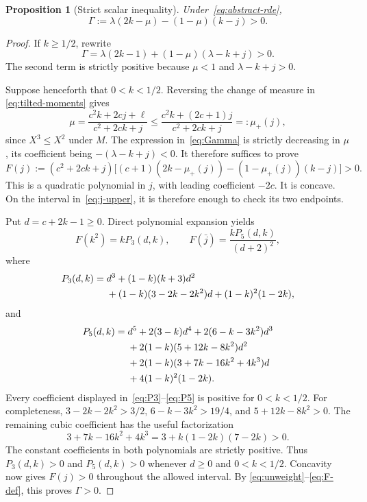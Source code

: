\documentclass[11pt,a4paper]{article}
\numberwithin{equation}{section}
\theoremstyle{plain}
\newtheorem{proposition}[proposition]{Proposition}
\theoremstyle{definition}
\theoremstyle{remark}
\begin{document}
\begin{proposition}[Strict scalar inequality]\label{prop:Gamma}
Under~\eqref{eq:abstract-rde},
\begin{equation}\label{eq:Gamma}
 \Gamma:=\lambda(2k-\mu)-(1-\mu)(k-j)>0.
\end{equation}
\end{proposition}
\begin{proof}
If $k\ge1/2$, rewrite
\begin{equation}\label{eq:Gamma-largek}
 \Gamma=\lambda(2k-1)+(1-\mu)(\lambda-k+j)>0.
\end{equation}
The second term is strictly positive because $\mu<1$ and
$\lambda-k+j>0$.

Suppose henceforth that $0<k<1/2$.  Reversing the change of measure in
\eqref{eq:tilted-moments} gives
\begin{equation}\label{eq:unweight}
 \mu=\frac{c^2k+2cj+\ell}{c^2+2ck+j}
 \le\frac{c^2k+(2c+1)j}{c^2+2ck+j}=:\mu_+(j),
\end{equation}
since $X^3\le X^2$ under $M$.  The expression in~\eqref{eq:Gamma} is
strictly decreasing in $\mu$, its coefficient being
$-(\lambda-k+j)<0$.  It therefore suffices to prove
\begin{equation}\label{eq:F-def}
 F(j):=(c^2+2ck+j)
 \bigl[(c+1)(2k-\mu_+(j))-(1-\mu_+(j))(k-j)\bigr]>0.
\end{equation}
This is a quadratic polynomial in $j$, with leading coefficient $-2c$.
It is concave.  On the interval in~\eqref{eq:j-upper}, it is therefore
enough to check its two endpoints.

Put $d=c+2k-1\ge0$.  Direct polynomial expansion yields
\begin{equation}\label{eq:F-endpoints}
 F(k^2)=kP_3(d,k),\qquad
 F(\bar j)=\frac{kP_5(d,k)}{(d+2)^2},
\end{equation}
where
\begin{align}\label{eq:P3}
 P_3(d,k)
 ={}&d^3+(1-k)(k+3)d^2\notag\\
 &+(1-k)(3-2k-2k^2)d+(1-k)^2(1-2k),
\end{align}
and
\begin{align}\label{eq:P5}
 P_5(d,k)
 ={}&d^5+2(3-k)d^4+2(6-k-3k^2)d^3\notag\\
 &+2(1-k)(5+12k-8k^2)d^2\notag\\
 &+2(1-k)(3+7k-16k^2+4k^3)d\notag\\
 &+4(1-k)^2(1-2k).
\end{align}
Every coefficient displayed in~\eqref{eq:P3}--\eqref{eq:P5} is positive
for $0<k<1/2$.  For completeness,
$3-2k-2k^2>3/2$,
$6-k-3k^2>19/4$, and $5+12k-8k^2>0$.  The remaining cubic coefficient
has the useful factorization
\begin{equation}\label{eq:cubic-coeff}
 3+7k-16k^2+4k^3=3+k(1-2k)(7-2k)>0.
\end{equation}
The constant coefficients in both polynomials are strictly positive.
Thus $P_3(d,k)>0$ and $P_5(d,k)>0$ whenever $d\ge0$ and $0<k<1/2$.
Concavity now gives $F(j)>0$ throughout the allowed interval.  By
\eqref{eq:unweight}--\eqref{eq:F-def}, this proves $\Gamma>0$.
\end{proof}
\end{document}
